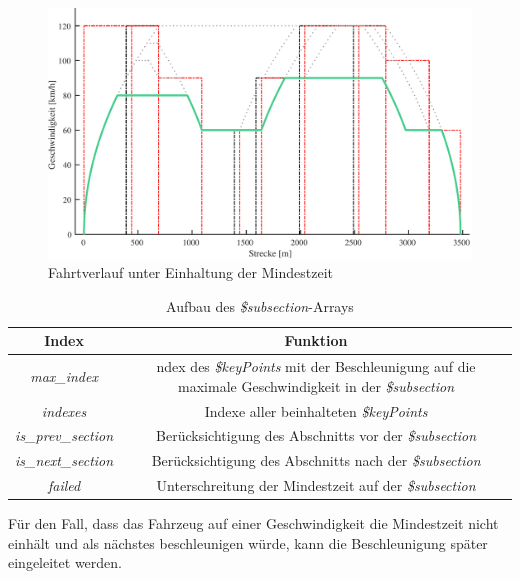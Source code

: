 \begin{figure}
\includegraphics[width=\linewidth]{../images/matlab/it9.pdf}
\caption{Fahrtverlauf unter Einhaltung der Mindestzeit}
\label{fig:it9}
\end{figure}
\begin{table}
\begin{center}
\renewcommand{\arraystretch}{1.2}
\begin{tabular}{c|c}
Index & Funktion \\ \hline
\textit{max\_index}                 	&  	\makecell{ndex des \textit{\$keyPoints} mit der Beschleunigung auf die\\maximale Geschwindigkeit in der \textit{\$subsection}}     \\ \hline
\textit{indexes}                 		&    	Indexe aller beinhalteten \textit{\$keyPoints}                  \\ \hline
\textit{is\_prev\_section}           	&   	Berücksichtigung des Abschnitts vor der \textit{\$subsection}     \\ \hline
\textit{is\_next\_section}           	&     	Berücksichtigung des Abschnitts nach der \textit{\$subsection}                 \\ \hline
\textit{failed}                 		&   	Unterschreitung der Mindestzeit auf der \textit{\$subsection}     \\ 
\end{tabular}
\renewcommand{\arraystretch}{1}
\caption{Aufbau des \textit{\$subsection}-Arrays}
\label{table:subsection}
\end{center}
\end{table}
Für den Fall, dass das Fahrzeug auf einer Geschwindigkeit die Mindestzeit nicht einhält und als nächstes beschleunigen würde, kann die Beschleunigung später eingeleitet werden. 
